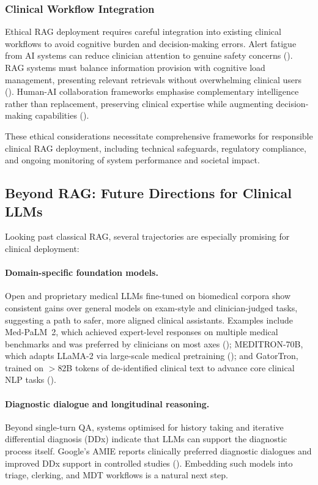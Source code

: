 \subsubsection{Clinical Workflow Integration}
Ethical RAG deployment requires careful integration into existing clinical workflows to avoid cognitive burden and decision-making errors. Alert fatigue from AI systems can reduce clinician attention to genuine safety concerns (\citep{ancker2017effects}). RAG systems must balance information provision with cognitive load management, presenting relevant retrievals without overwhelming clinical users (\citep{bates2003reducing}). Human-AI collaboration frameworks emphasise complementary intelligence rather than replacement, preserving clinical expertise while augmenting decision-making capabilities (\citep{rajkomar2019machine}).

These ethical considerations necessitate comprehensive frameworks for responsible clinical RAG deployment, including technical safeguards, regulatory compliance, and ongoing monitoring of system performance and societal impact.

\subsection{Beyond RAG: Future Directions for Clinical LLMs}

Looking past classical RAG, several trajectories are especially promising for clinical deployment:

\paragraph{Domain-specific foundation models.}
Open and proprietary medical LLMs fine-tuned on biomedical corpora show consistent gains over general models on exam-style and clinician-judged tasks, suggesting a path to safer, more aligned clinical assistants. Examples include Med-PaLM~2, which achieved expert-level responses on multiple medical benchmarks and was preferred by clinicians on most axes (\citep{singhal2024medpalm2}); MEDITRON-70B, which adapts LLaMA-2 via large-scale medical pretraining (\citep{chen2023meditron}); and GatorTron, trained on $>$82B tokens of de-identified clinical text to advance core clinical NLP tasks (\citep{yang2022gatortron}).

\paragraph{Diagnostic dialogue and longitudinal reasoning.}
Beyond single-turn QA, systems optimised for history taking and iterative differential diagnosis (DDx) indicate that LLMs can support the diagnostic process itself. Google's AMIE reports clinically preferred diagnostic dialogues and improved DDx support in controlled studies (\citep{amie2025nature,amie2024blog}). Embedding such models into triage, clerking, and MDT workflows is a natural next step.

